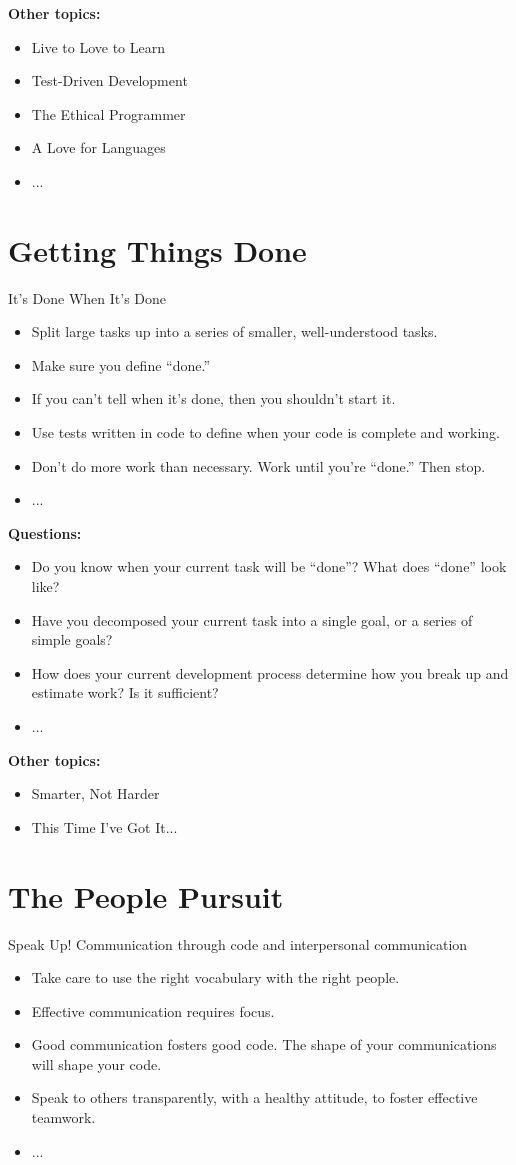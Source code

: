 \documentclass{mypresentation}
\begin{document}
\textbf{Other topics:}
\begin{itemize}
\item Live to Love to Learn
\item Test-Driven Development
\item The Ethical Programmer
\item A Love for Languages
\item ...
\end{itemize}
\newpage

\section{Getting Things Done}
It's Done When It's Done
\begin{itemize}
\item Split large tasks up into a series of smaller, well-understood tasks.
\item Make sure you define “done.”
\item If you can’t tell when it’s done, then you shouldn’t start it.
\item Use tests written in code to define when your code is complete and working.
\item Don’t do more work than necessary. Work until you’re “done.” Then stop.
\item ...
\end{itemize}
\newpage

\textbf{Questions:}
\begin{itemize}
\item Do you know when your current task will be “done”? What does “done” look like?
\item Have you decomposed your current task into a single goal, or a series of simple goals?
\item How does your current development process determine how you break up and estimate work? Is it sufficient?
\item ...
\end{itemize}
\newpage

\textbf{Other topics:}
\begin{itemize}
\item Smarter, Not Harder
\item This Time I've Got It...
\end{itemize}
\newpage

\section{The People Pursuit}
Speak Up! Communication through code and interpersonal communication
\begin{itemize}
\item Take care to use the right vocabulary with the right people.
\item Effective communication requires focus.
\item Good communication fosters good code. The shape of your communications will shape your code.
\item Speak to others transparently, with a healthy attitude, to foster effective teamwork.
\item ...
\end{itemize}
\newpage
\end{document}
